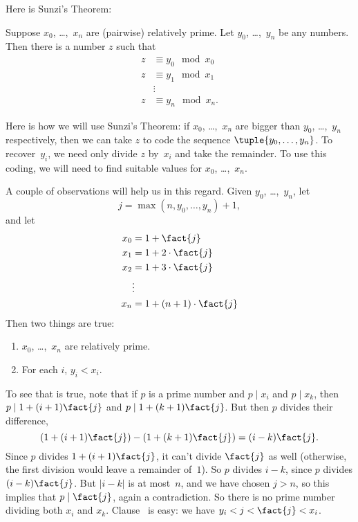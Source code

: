\documentclass[../../../include/open-logic-section]{subfiles}
\begin{document}
Here is Sunzi's Theorem:
\begin{thm}
Suppose $x_0$, \dots,~$x_n$ are (pairwise) relatively prime. Let
$y_0$, \dots,~$y_n$ be any numbers. Then there is a number $z$ such that
\begin{align*}
z & \equiv y_0 \mod x_0 \\
z & \equiv y_1 \mod x_1 \\
& \vdots  \\
z & \equiv y_n \mod x_n.
\end{align*}
\end{thm}

Here is how we will use Sunzi's Theorem: if $x_0$,
\dots,~$x_n$ are bigger than $y_0$, \dots,~$y_n$ respectively, then we
can take $z$ to code the sequence $\tuple{y_0, \dots,y_n}$. To
recover~$y_i$, we need only divide $z$ by~$x_i$ and take the
remainder. To use this coding, we will need to find suitable values
for $x_0$, \dots,~$x_n$.

A couple of observations will help us in this regard. Given
$y_0$, \dots,~$y_n$, let
\[
j = \max(n, y_0, \dots, y_n) + 1,
\]
and let
\begin{align*}
x_0 & = 1 + \fact{j} \\
x_1 & = 1 + 2 \cdot \fact{j} \\
x_2 & = 1 + 3 \cdot \fact{j} \\
& \vdots  \\
x_n & = 1 + (n+1) \cdot \fact{j}
\end{align*}
Then two things are true:
\begin{enumerate}
\item{} $x_0$, \dots,~$x_n$ are relatively prime.
\item{} For each $i$, $y_i < x_i$.
\end{enumerate}
To see that  is true, note that if $p$ is a prime number and $p
\mid x_i$ and $p \mid x_k$, then $p \mid 1 + (i+1) \fact{j}$ and $p \mid
1 + (k+1) \fact{j}$. But then $p$ divides their difference,
\[
(1 + (i+1)\fact{j}) - (1+ (k+1)\fact{j}) = (i-k) \fact{j}.
\]
Since $p$ divides $1 + (i+1)\fact{j}$, it can't divide $\fact{j}$ as well
(otherwise, the first division would leave a remainder of~$1$). So $p$
divides $i-k$, since $p$ divides $(i-k)\fact{j}$. But $\left| i-k
\right|$ is at most~$n$, and we have chosen $j > n$, so this implies
that $p \mid \fact{j}$, again a contradiction. So there is no prime
number dividing both $x_i$ and $x_k$. Clause~ is easy: we have $y_i <
j < \fact{j} < x_i$.
\end{document}

